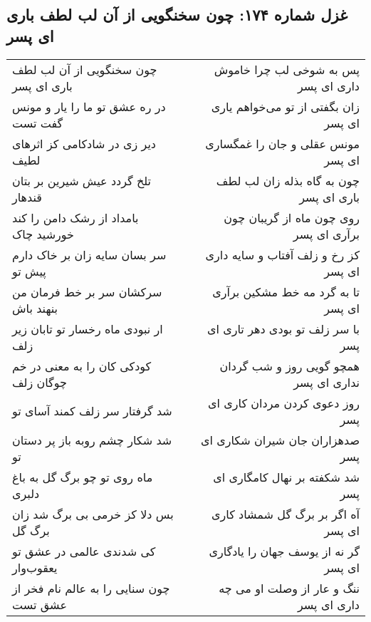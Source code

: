 \begin{center}
\section*{غزل شماره ۱۷۴: چون سخنگویی از آن لب لطف باری ای پسر}
\label{sec:174}
\begin{longtable}{l p{0.5cm} r}
چون سخنگویی از آن لب لطف باری ای پسر
&&
پس به شوخی لب چرا خاموش داری ای پسر
\\
در ره عشق تو ما را یار و مونس گفت تست
&&
زان بگفتی از تو می‌خواهم یاری ای پسر
\\
دیر زی در شادکامی کز اثرهای لطیف
&&
مونس عقلی و جان را غمگساری ای پسر
\\
تلخ گردد عیش شیرین بر بتان قندهار
&&
چون به گاه بذله زان لب لطف باری ای پسر
\\
بامداد از رشک دامن را کند خورشید چاک
&&
روی چون ماه از گریبان چون برآری ای پسر
\\
سر بسان سایه زان بر خاک دارم پیش تو
&&
کز رخ و زلف آفتاب و سایه داری ای پسر
\\
سرکشان سر بر خط فرمان من بنهند باش
&&
تا به گرد مه خط مشکین برآری ای پسر
\\
ار نبودی ماه رخسار تو تابان زیر زلف
&&
با سر زلف تو بودی دهر تاری ای پسر
\\
کودکی کان را به معنی در خم چوگان زلف
&&
همچو گویی روز و شب گردان نداری ای پسر
\\
شد گرفتار سر زلف کمند آسای تو
&&
روز دعوی کردن مردان کاری ای پسر
\\
شد شکار چشم روبه باز پر دستان تو
&&
صدهزاران جان شیران شکاری ای پسر
\\
ماه روی تو چو برگ گل به باغ دلبری
&&
شد شکفته بر نهال کامگاری ای پسر
\\
بس دلا کز خرمی بی برگ شد زان برگ گل
&&
آه اگر بر برگ گل شمشاد کاری ای پسر
\\
کی شدندی عالمی در عشق تو یعقوب‌وار
&&
گر نه از یوسف جهان را یادگاری ای پسر
\\
چون سنایی را به عالم نام فخر از عشق تست
&&
ننگ و عار از وصلت او می چه داری ای پسر
\\
\end{longtable}
\end{center}
